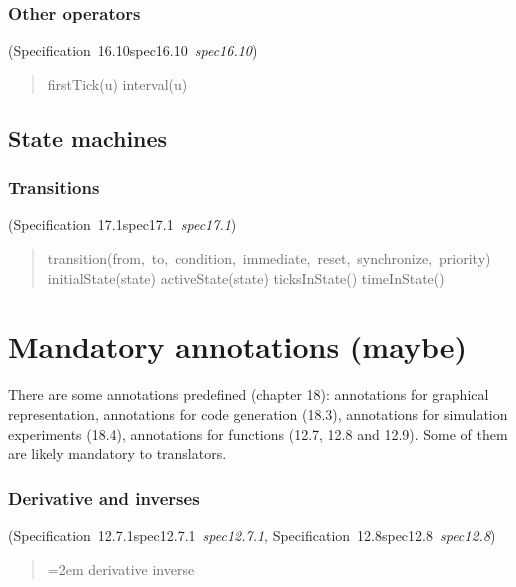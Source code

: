 \documentclass[10pt,b5paper]{article}
\def\specrefx#1#2{Specification~#1\ifx\relax#2\relax{}\else~{\it{}#2}\fi}
\def\specref#1{\specrefx{#1}{\csname spec#1\endcsname}}
\begin{document}
\subsubsection*{Other operators}
(\specref{16.10}\/)

\begin{quote}\widespacing

firstTick(u)
interval(u)

\end{quote}


\subsection{State machines}

\subsubsection*{Transitions}
(\specref{17.1}\/)

\begin{quote}\widespacing

transition(from,~to,~condition,~immediate,~reset,~synchronize,~priority)
initialState(state)
activeState(state)
ticksInState()
timeInState()

\end{quote}


\section{Mandatory annotations (maybe)}

\def\quotespace{\spaceskip=2em%
\sloppy\hyphenpenalty=10000\exhyphenpenalty=10000}

There are some annotations predefined (chapter 18): annotations for
graphical representation, annotations for code generation (18.3),
annotations for simulation experiments (18.4), annotations for
functions (12.7, 12.8 and 12.9).  Some of them are likely mandatory to
translators.

\subsubsection*{Derivative and inverses}
(\specref{12.7.1}, \specref{12.8}\/)

\begin{quote}\spaceskip=2em
derivative
inverse
\end{quote}
\end{document}
